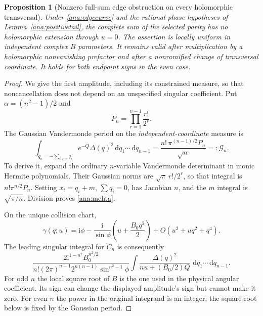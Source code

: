 \documentclass[11pt]{article}
\numberwithin{equation}{section}
\newtheorem{proposition}[theorem]{Proposition}
\theoremstyle{definition}
\newcommand{\ii}{\mathrm i}
\newcommand{\dd}{\,\mathrm d}
\begin{document}
\begin{proposition}[Nonzero full-sum edge obstruction on every
holomorphic transversal]\label{ana:positive}
Under \eqref{ana:edgecurve} and the rational-phase hypotheses of
Lemma~\ref{ana:positivetail}, the complete sum of the selected
parity has no holomorphic extension through \(u=0\).
The assertion is locally uniform in independent complex \(B\)
parameters. It remains valid after multiplication by a
holomorphic nonvanishing prefactor and after a nonramified change
of transversal coordinate. It holds for both endpoint signs in
the even case.
\end{proposition}
\begin{proof}
We give the first amplitude, including its constrained measure, so that
noncancellation does not depend on an unspecified singular coefficient.
Put \(\alpha=(n^2-1)/2\) and
\[
 P_n=\prod_{r=1}^{n-1}\frac{r!}{2^r}.
\]
The Gaussian Vandermonde period on the \emph{independent-coordinate}
measure is
\begin{equation}\label{ana:mehta}
 \int_{q_n=-\sum_{i<n}q_i}e^{-Q}\Delta(q)^2
               \dd q_1\cdots\dd q_{n-1}
 =\frac{n!\,\pi^{(n-1)/2}P_n}{\sqrt n}=:\mathcal G_n.
\end{equation}
To derive it, expand the ordinary \(n\)-variable Vandermonde
determinant in monic Hermite polynomials. Their Gaussian norms are
\(\sqrt\pi\,r!/2^r\), so that integral is
\(n!\pi^{n/2}P_n\). Setting \(x_i=q_i+m\), \(\sum q_i=0\),
has Jacobian \(n\), and the \(m\) integral is \(\sqrt{\pi/n}\).
Division proves \eqref{ana:mehta}.

On the unique collision chart,
\[
 \gamma(q;u)=\ii\phi-\frac{\ii}{\sin\phi}
       \left(u+\frac{B_0q^2}{2}\right)
       +O(u^2+u q^2+q^4).
\]
The leading singular integral for \(C_n\) is consequently
\begin{equation}\label{ana:firstintegral}
 \frac{2\ii^{1-n^2}B_0^{n^2/2}}
 {n!(2\pi)^{n-1}2^{n(n-1)}\sin^{n^2-1}\phi}
 \int\frac{\Delta(q)^2}{nu+(B_0/2)Q}\,
             \dd q_1\cdots\dd q_{n-1}.
\end{equation}
For odd \(n\) the local square root of \(B\) is the one used in
the physical angular coefficient. Its sign can change the displayed
amplitude's sign but cannot make it zero. For even \(n\) the
power in the original integrand is an integer; the square root
below is fixed by the Gaussian period.


\end{proof}
\end{document}
